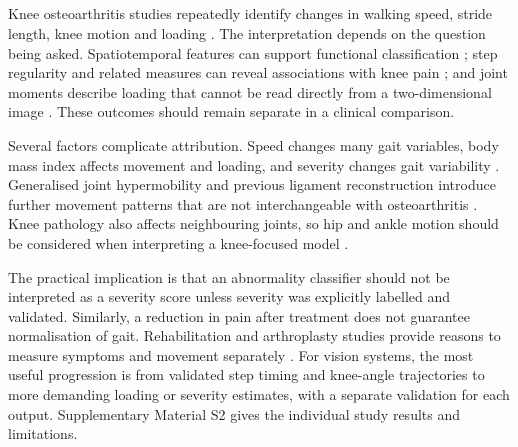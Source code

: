\documentclass[12pt,nopreprintline]{elsarticle}
\begin{document}
\subsection{}
\label{sec:knee_synthesis}
\begin{revision}
Knee osteoarthritis studies repeatedly identify changes in walking speed, stride length, knee motion and loading \cite{kaufman2001gait,astephen2008biomechanical,favre2016gait}. The interpretation depends on the question being asked. Spatiotemporal features can support functional classification \cite{elbaz2014novel}; step regularity and related measures can reveal associations with knee pain \cite{bacon2022relation}; and joint moments describe loading that cannot be read directly from a two-dimensional image \cite{baliunas2002increased,andriacchi2006role}. These outcomes should remain separate in a clinical comparison.

Several factors complicate attribution. Speed changes many gait variables, body mass index affects movement and loading, and severity changes gait variability \cite{bejek2006influence,harding2012body,kiss2011effect}. Generalised joint hypermobility and previous ligament reconstruction introduce further movement patterns that are not interchangeable with osteoarthritis \cite{simonsen2012gait,butler2009gait}. Knee pathology also affects neighbouring joints, so hip and ankle motion should be considered when interpreting a knee-focused model \cite{ro2019effects,weidow2006hip}.

The practical implication is that an abnormality classifier should not be interpreted as a severity score unless severity was explicitly labelled and validated. Similarly, a reduction in pain after treatment does not guarantee normalisation of gait. Rehabilitation and arthroplasty studies provide reasons to measure symptoms and movement separately \cite{qingguang2015gait,bkaczkowicz2018gait,mcclelland2007gait}. For vision systems, the most useful progression is from validated step timing and knee-angle trajectories to more demanding loading or severity estimates, with a separate validation for each output. Supplementary Material S2 gives the individual study results and limitations.
\end{revision}
\end{document}
